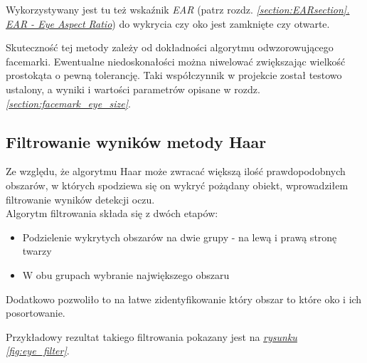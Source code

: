 Wykorzystywany jest tu też wskaźnik \textit{EAR} (patrz rozdz. \hyperref[{section:EARsection}]{\textit{\ref{section:EARsection}. EAR - Eye Aspect Ratio}}) do wykrycia czy oko jest zamknięte czy otwarte.
\par
Skuteczność tej metody zależy od dokładności algorytmu odwzorowującego facemarki. Ewentualne niedoskonałości można niwelować zwiększając wielkość prostokąta o pewną tolerancję. Taki współczynnik w projekcie został testowo ustalony, a wyniki i wartości parametrów opisane w rozdz. \hyperref[{section:facemark_eye_size}]{\textit{\ref{section:facemark_eye_size}}}.



\subsection{Filtrowanie wyników metody Haar}

Ze względu, że algorytmu Haar może zwracać większą ilość prawdopodobnych obszarów, w których spodziewa się on wykryć pożądany obiekt, wprowadziłem filtrowanie wyników detekcji oczu. \\
Algorytm filtrowania składa się z dwóch etapów:

\begin{itemize}
    \item Podzielenie wykrytych obszarów na dwie grupy - na lewą i prawą stronę twarzy
    \item W obu grupach wybranie największego obszaru
\end{itemize}


Dodatkowo pozwoliło to na łatwe zidentyfikowanie który obszar to które oko i ich posortowanie.
\par
Przykładowy rezultat takiego filtrowania pokazany jest na \hyperref[{fig:eye_filter}]{\textit{rysunku \ref{fig:eye_filter}}}. 


